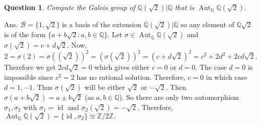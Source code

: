 \documentclass[11pt]{amsart}
\newtheorem{qns}[theorem]{Question}
\newcommand{\QQ}{\mathbb Q}
\newcommand{\ZZ}{\mathbb Z}
\DeclareMathOperator{\aut}{\text{Aut}}
\DeclareMathOperator{\id}{\text{id}}
\begin{document}
\begin{qns}
Compute the Galois group of ${\QQ}(\sqrt{2})|{\QQ}$ that is $\aut_{\QQ}{\QQ}(\sqrt{2}).$
\end{qns}
Ans. $\mathcal{B}=\{1,\sqrt{2}\}$ is a basis of the extension ${\QQ}(\sqrt{2})|{\QQ}$ so any element of ${\QQ}{\sqrt{2}}$ is of the form $\{a+b\sqrt{2}:a,b\in {\QQ}\}$. Let $\sigma\in \aut_{\QQ}{\QQ}(\sqrt{2})$ and $\sigma(\sqrt{2})=c+d\sqrt{2}$. Now, $$2=\sigma(2)=\sigma((\sqrt{2}))^2=(\sigma(\sqrt{2}))^2=(c+d\sqrt{2})^2=c^2+2d^2+2cd\sqrt{2}.$$ Therefore we get $2cd\sqrt{2}=0$ which gives either $c=0$ or $d=0$. The case $d=0$ is impossible since $c^2=2$ has no rational solution. Therefore, $c=0$ in which case $d=1,-1$. Thus $\sigma(\sqrt{2})$ will be either $\sqrt{2}$ or $-\sqrt{2}.$ Then $\sigma(a+b\sqrt{2})=a\pm b\sqrt{2}$ (as $a,b\in {\QQ}$). So there are only two automorphism $\sigma_1,\sigma_2$ with $\sigma_1=\id$ and $\sigma_2(\sqrt{2})=-\sqrt{2}.$ Therefore, $\aut_{\QQ}{\QQ}(\sqrt{2})=\{\id,\sigma_2\}\cong {\ZZ}/2{\ZZ}.$
\end{document}
